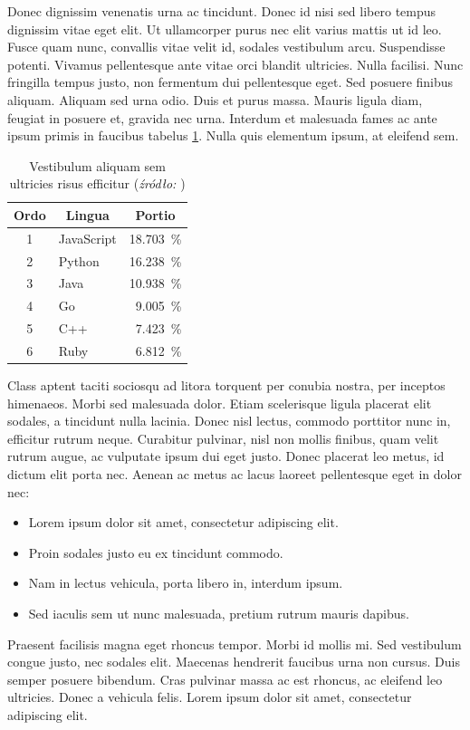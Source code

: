 \documentclass[polish,engineering]{wizthesis}
\begin{document}
Donec dignissim venenatis urna ac tincidunt. Donec id nisi sed libero tempus dignissim vitae eget elit. Ut ullamcorper purus nec elit varius mattis ut id leo. Fusce quam nunc, convallis vitae velit id, sodales vestibulum arcu. Suspendisse potenti.
Vivamus pellentesque ante vitae orci blandit ultricies. Nulla facilisi. Nunc fringilla tempus justo, non fermentum dui pellentesque eget. Sed posuere finibus aliquam. Aliquam sed urna odio. Duis et purus massa. Mauris ligula diam, feugiat in posuere et, gravida nec urna. Interdum et malesuada fames ac ante ipsum primis in faucibus tabelus \ref{tab:jezyki}. Nulla quis elementum ipsum, at eleifend sem.
\begin{table}[ht]
  \centering
  \caption{Vestibulum aliquam sem ultricies risus efficitur (\textit{źródło: \cite{latexcompanion}})}
  \label{tab:jezyki}
  \begin{tabular}{|c|l|r|}
    \hline
    Ordo & \multicolumn{1}{c|}{Lingua} & \multicolumn{1}{c|}{Portio} \\ \hline
    1    & JavaScript                  & \SI{18.703}{\percent}       \\ \hline
    2    & Python                      & \SI{16.238}{\percent}       \\ \hline
    3    & Java                        & \SI{10.938}{\percent}       \\ \hline
    4    & Go                          & \SI{9.005}{\percent}        \\ \hline
    5    & C++                         & \SI{7.423}{\percent}        \\ \hline
    6    & Ruby                        & \SI{6.812}{\percent}        \\ \hline
  \end{tabular}
\end{table}
Class aptent taciti sociosqu ad litora torquent per conubia nostra, per inceptos himenaeos. Morbi sed malesuada dolor. Etiam scelerisque ligula placerat elit sodales, a tincidunt nulla lacinia. Donec nisl lectus, commodo porttitor nunc in, efficitur rutrum neque. Curabitur pulvinar, nisl non mollis finibus, quam velit rutrum augue, ac vulputate ipsum dui eget justo. Donec placerat leo metus, id dictum elit porta nec. Aenean ac metus ac lacus laoreet pellentesque eget in dolor \cite[chap. 2]{latexcompanion} nec:
\begin{itemize}[noitemsep]
  \item Lorem ipsum dolor sit amet, consectetur adipiscing elit.
  \item Proin sodales justo eu ex tincidunt commodo.
  \item Nam in lectus vehicula, porta libero in, interdum ipsum.
  \item Sed iaculis sem ut nunc malesuada, pretium rutrum mauris dapibus.
\end{itemize}
Praesent facilisis magna eget rhoncus tempor. Morbi id mollis mi. Sed vestibulum congue justo, nec sodales elit. Maecenas hendrerit faucibus urna non cursus. Duis semper posuere bibendum. Cras pulvinar massa ac est rhoncus, ac eleifend leo ultricies. Donec a vehicula felis. Lorem ipsum dolor sit amet, consectetur adipiscing elit.
\end{document}
